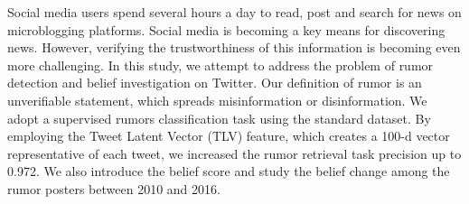 Social media users spend several hours a day to read, post and search for news on microblogging platforms. Social media is becoming a key means for discovering news. However, verifying the trustworthiness of this information is becoming even more challenging. In this study, we attempt to address the problem of rumor detection and belief investigation on Twitter. Our definition of rumor is an unverifiable statement, which spreads misinformation or disinformation. We adopt a supervised rumors classification task using the standard dataset. By employing the Tweet Latent Vector (TLV) feature, which creates a 100-d vector representative of each tweet, we increased the rumor retrieval task precision up to 0.972. We also introduce the belief score and study the belief change among the rumor posters between 2010 and 2016.
